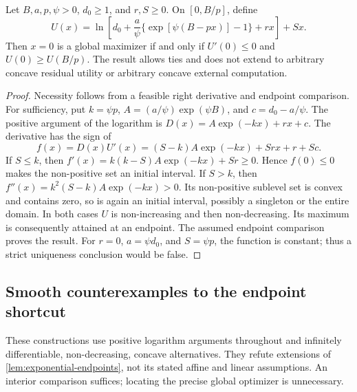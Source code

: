\begin{lemma}
\label{lem:exponential-endpoints}
Let $B,a,p,\psi>0$, $d_0\geq1$, and $r,S\geq0$. On $[0,B/p]$,
define
\begin{equation}
 U(x)=\ln\!\left[d_0+\frac a\psi
   \{\exp[\psi(B-px)]-1\}+rx\right]+Sx.
 \label{eq:exponential-objective}
\end{equation}
Then $x=0$ is a global maximizer if and only if
$U'(0)\leq0$ and $U(0)\geq U(B/p)$.
The result allows ties and does not extend to arbitrary concave
residual utility or arbitrary concave external computation.
\end{lemma}
\begin{proof}
Necessity follows from a feasible right derivative and endpoint
comparison. For sufficiency, put $k=\psi p$,
$A=(a/\psi)\exp(\psi B)$, and $c=d_0-a/\psi$. The positive
argument of the logarithm is $D(x)=A\exp(-kx)+rx+c$.
The derivative has the sign of
\[
 f(x)=D(x)U'(x)=(S-k)A\exp(-kx)+Sr x+r+Sc.
\]
If $S\leq k$, then
$f'(x)=k(k-S)A\exp(-kx)+Sr\geq0$. Hence $f(0)\leq0$ makes
the non-positive set an initial interval. If $S>k$, then
$f''(x)=k^2(S-k)A\exp(-kx)>0$. Its non-positive sublevel set
is convex and contains zero, so is again an initial interval, possibly
a singleton or the entire domain. In both cases $U$ is non-increasing
and then non-decreasing. Its maximum is consequently attained at an
endpoint. The assumed endpoint comparison proves the result.
For $r=0$, $a=\psi d_0$, and $S=\psi p$, the function is constant;
thus a strict uniqueness conclusion would be false.
\end{proof}

\subsection{Smooth counterexamples to the endpoint shortcut}
\label{app:exponential-counterexamples}
These constructions use positive logarithm arguments throughout and
infinitely differentiable, non-decreasing, concave alternatives.
They refute extensions of \cref{lem:exponential-endpoints}, not its
stated affine and linear assumptions. An interior comparison suffices;
locating the precise global optimizer is unnecessary.

